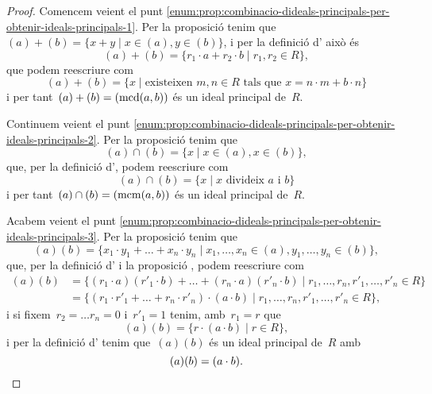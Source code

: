 \documentclass[../estructures-algebraiques.tex]{subfiles}
\begin{document}
    \begin{proof}%
        Comencem veient el punt \eqref{enum:prop:combinacio-dideals-principals-per-obtenir-ideals-principals-1}.
        Per la proposició  tenim que~\((a)+(b)=\{x+y\mid x\in(a),y\in(b)\}\), i per la definició d' això és
        \[
            (a)+(b)=\{r_{1}\cdot a+r_{2}\cdot b\mid r_{1},r_{2}\in R\},
        \]
        que podem reescriure com
        \[
            (a)+(b)=\{x\mid\text{existeixen }m,n\in R\text{ tals que }x=n\cdot m+b\cdot n\}
        \]
        i per tant~\((a)+(b)=(\operatorname{mcd}(a,b))\) és un ideal principal de~\(R\).

        Continuem veient el punt \eqref{enum:prop:combinacio-dideals-principals-per-obtenir-ideals-principals-2}.
        Per la proposició  tenim que
        \[
            (a)\cap(b)=\{x\mid x\in(a),x\in(b)\},
        \]
        que, per la definició d', podem reescriure com
        \[
            (a)\cap(b)=\{x\mid x\text{ divideix }a\text{ i }b\}
        \]
        i per tant~\((a)\cap(b)=(\operatorname{mcm}(a,b))\) és un ideal principal de~\(R\).

        Acabem veient el punt \eqref{enum:prop:combinacio-dideals-principals-per-obtenir-ideals-principals-3}.
        Per la proposició  tenim que
        \[
            (a)(b)=\{x_{1}\cdot y_{1}+\dots+x_{n}\cdot y_{n}\mid x_{1},\dots,x_{n}\in(a),y_{1},\dots,y_{n}\in(b)\},
        \]
        que, per la definició d' i la proposició , podem reescriure com
        \begin{align*}
        (a)(b)&=\{(r_{1}\cdot a)(r'_{1}\cdot b)+\dots+(r_{n}\cdot a)(r'_{n}\cdot b)\mid r_{1},\dots,r_{n},r'_{1},\dots,r'_{n}\in R\}\\
        &=\{(r_{1}\cdot r'_{1}+\dots+r_{n}\cdot r'_{n})\cdot(a\cdot b)\mid r_{1},\dots,r_{n},r'_{1},\dots,r'_{n}\in R\},
        \end{align*}
        i si fixem~\(r_{2}=\dots r_{n}=0\) i~\(r'_{1}=1\) tenim, amb~\(r_{1}=r\) que
        \[
            (a)(b)=\{r\cdot(a\cdot b)\mid r\in R\},
        \]
        i per la definició d' tenim que~\((a)(b)\) és un ideal principal de~\(R\) amb
        \[
            (a)(b)=(a\cdot b).\qedhere
        \]
    \end{proof}
\end{document}
